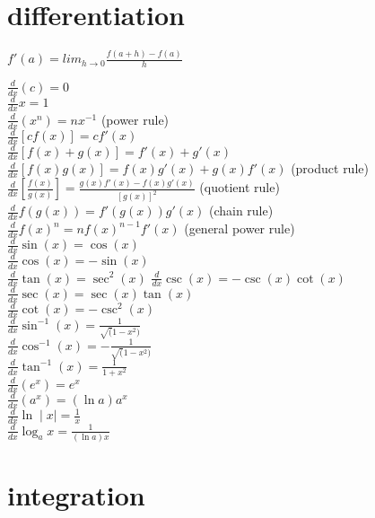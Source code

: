 \documentclass{article}
\begin{document}
\newpage
\section*{differentiation}

\begin{center} $f'(a) = lim_{h \to 0}\frac{f(a + h) - f(a)}{h}$ \end{center}

$\frac{d}{dx}(c) = 0$\\
$\frac{d}{dx}x = 1$\\
$\frac{d}{dx}(x^n) = nx^{-1}$ (power rule)\\
$\frac{d}{dx}[cf(x)] = cf'(x)$\\
$\frac{d}{dx}[f(x)+g(x)] = f'(x) + g'(x)$\\
$\frac{d}{dx}[f(x)g(x)] = f(x)g'(x) + g(x)f'(x)$ (product rule)\\
$\frac{d}{dx}[\frac{f(x)}{g(x)}] = \frac{g(x)f'(x) - f(x)g'(x)}{[g(x)]^2}$ (quotient rule)\\
$\frac{d}{dx}f(g(x)) = f'(g(x))g'(x)$ (chain rule)\\
$\frac{d}{dx}f(x)^n = nf(x)^{n-1}f'(x)$ (general power rule)\\
$\frac{d}{dx}\sin(x) = \cos(x)$\\ 
$\frac{d}{dx}\cos(x) = -\sin(x)$\\
$\frac{d}{dx}\tan(x) = \sec^2(x)$
$\frac{d}{dx}\csc(x) = -\csc(x)\cot(x)$\\
$\frac{d}{dx}\sec(x) = \sec(x)\tan(x)$\\
$\frac{d}{dx}\cot(x) = -\csc^2(x)$\\
$\frac{d}{dx}\sin^{-1}(x) = \frac{1}{\sqrt(1 - x^2)}$\\
$\frac{d}{dx}\cos^{-1}(x) = -\frac{1}{\sqrt(1 - x^2)}$\\
$\frac{d}{dx}\tan^{-1}(x) = \frac{1}{1 + x^2}$\\
$\frac{d}{dx}(e^x) = e^x$\\
$\frac{d}{dx}(a^x) = (\ln a)a^x$\\
$\frac{d}{dx}\ln\mid x\mid = \frac{1}{x}$\\
$\frac{d}{dx}\log_ax = \frac{1}{(\ln a)x}$\\

\section*{integration}
\end{document}
